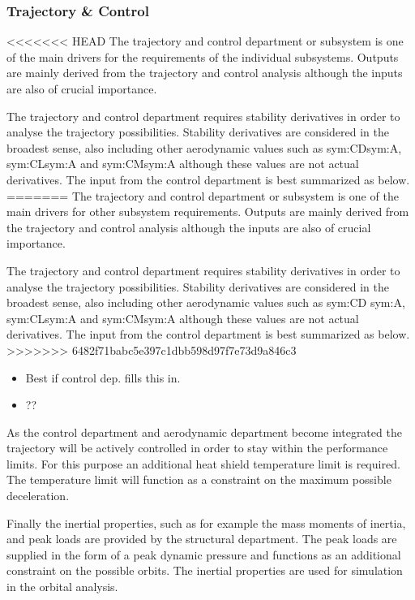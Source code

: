 \subsubsection{Trajectory \& Control}

<<<<<<< HEAD
The trajectory and control department or subsystem is one of the main drivers for the requirements of the individual subsystems. Outputs are mainly derived from the trajectory and control analysis although the inputs are also of crucial importance. 

The trajectory and control department requires stability derivatives in order to analyse the trajectory possibilities. Stability derivatives are considered in the broadest sense, also including other aerodynamic values such as \gls{sym:CD}\gls{sym:A}, \gls{sym:CL}\gls{sym:A} and \gls{sym:CM}\gls{sym:A} although these values are not actual derivatives. The input from the control department is  best summarized as below.
=======
The trajectory and control department or subsystem is one of the main drivers for other subsystem requirements. Outputs are mainly derived from the trajectory and control analysis although the inputs are also of crucial importance. 

The trajectory and control department requires stability derivatives in order to analyse the trajectory possibilities. Stability derivatives are considered in the broadest sense, also including other aerodynamic values such as \gls{sym:CD} \gls{sym:A}, \gls{sym:CL}\gls{sym:A} and \gls{sym:CM}\gls{sym:A} although these values are not actual derivatives. The input from the control department is best summarized as below.
>>>>>>> 6482f71babc5e397c1dbb598d97f7e73d9a846c3

\begin{itemize}
\item Best if control dep. fills this in.
\item ??
\end{itemize}

As the control department and aerodynamic department become integrated the trajectory will be actively controlled in order to stay within the performance limits. For this purpose an additional heat shield temperature limit is required. The temperature limit will function as a constraint on the maximum possible deceleration.

Finally the inertial properties, such as for example the mass moments of inertia, and peak loads are provided by the structural department. The peak loads are supplied in the form of a peak dynamic pressure and functions as an additional constraint on the possible orbits. The inertial properties are used for simulation in the orbital analysis. 

